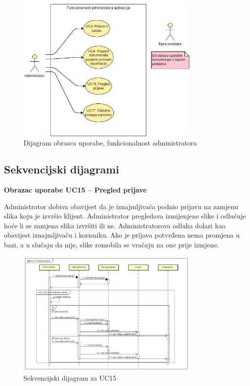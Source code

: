 					\begin{figure}[H]
						\centering
						\includegraphics[width=0.8\textwidth]{slike/AdminUC.png}
						\caption{Dijagram obrasca uporabe, funkcionalnost administratora}
						\label{fig:your_label}
					\end{figure}		
				
			\subsection{Sekvencijski dijagrami}
			
				\noindent \textbf{Obrazac uporabe UC15 – Pregled prijave}
				
				\noindent Administrator dobiva obavijest da je iznajmljivača podnio prijavu na zamjenu slika koju je izvršio klijent. Administrator pregledava izmijenjene slike i odlučuje hoće li se zamjena slika izvršiti ili ne. Administratorova odluka dolazi kao obavijest iznajmljivaču i korisniku. Ako je prijava potvrđena nema promjena u bazi, a u slučaju da nije, slike romobila se vraćaju na one prije izmjene.
				\eject
				
				\begin{figure}[H]
					\centering
					\includegraphics[width=0.8\textwidth]{slike/UC15_Pregled_prijave.png}
					\caption{Sekvencijski dijagram za UC15}
					\label{fig:your_label}
				\end{figure}
				

